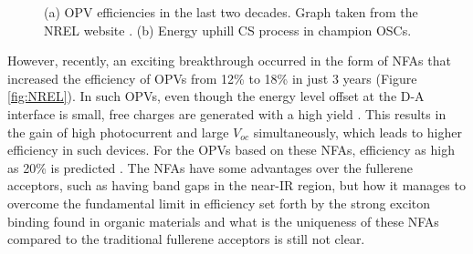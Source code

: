 \documentclass[12pt]{article}
\begin{document}
\begin{figure}[H]
\centering
{}
\caption{(a) OPV efficiencies in the last two decades. Graph taken from the NREL website \cite{NREL}. (b) Energy uphill CS process in champion OSCs.}
\label{fig:hot and cold}
\end{figure}

However, recently, an exciting breakthrough occurred in the form of NFAs that increased the efficiency of OPVs from 12\% to 18\% in just 3 years (Figure \ref{fig:NREL}). In such OPVs, even though the energy level offset at the D-A interface is small, free charges are generated with a high yield \cite{cheng2018next,hou2018organic,chen2018efficient}. This results in the gain of high photocurrent and large $V_{oc}$ simultaneously, which leads to higher efficiency in such devices. For the OPVs based on these NFAs, efficiency as high as 20\% is predicted \cite{li2018analyzing}.  The NFAs have some advantages over the fullerene acceptors, such as having band gaps in the near-IR region, but how it manages to overcome the fundamental limit in efficiency set forth by the strong exciton binding found in organic materials and what is the uniqueness of these NFAs compared to the traditional fullerene acceptors is still not clear. 
\vspace{7pt}
\end{document}
